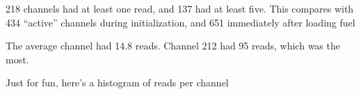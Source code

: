 218 channels had at least one read, and 137 had at least five.  
This compares with 434 ``active'' channels during initialization, and 651 immediately after loading fuel

The average channel had 14.8 reads. 
Channel 212 had 95 reads, which was the most.

Just for fun, here's a histogram of reads per channel\\
